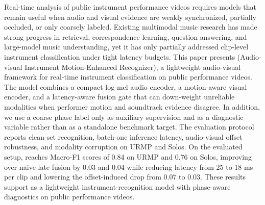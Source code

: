 Real-time analysis of public instrument performance videos requires models that remain useful when audio and visual evidence are weakly synchronized, partially occluded, or only coarsely labeled. Existing multimodal music research has made strong progress in retrieval, correspondence learning, question answering, and large-model music understanding, yet it has only partially addressed clip-level instrument classification under tight latency budgets. This paper presents \method{} (Audio-visual Instrument Motion-Enhanced Recognizer), a lightweight audio-visual framework for real-time instrument classification on public performance videos. The model combines a compact log-mel audio encoder, a motion-aware visual encoder, and a latency-aware fusion gate that can down-weight unreliable modalities when performer motion and soundtrack evidence disagree. In addition, we use a coarse phase label only as auxiliary supervision and as a diagnostic variable rather than as a standalone benchmark target. The evaluation protocol reports clean-set recognition, batch-one inference latency, audio-visual offset robustness, and modality corruption on URMP and Solos. On the evaluated setup, \method{} reaches Macro-F1 scores of 0.84 on URMP and 0.76 on Solos, improving over naive late fusion by 0.03 and 0.04 while reducing latency from 25 to 18 ms per clip and lowering the offset-induced drop from 0.07 to 0.03. These results support \method{} as a lightweight instrument-recognition model with phase-aware diagnostics on public performance videos.
